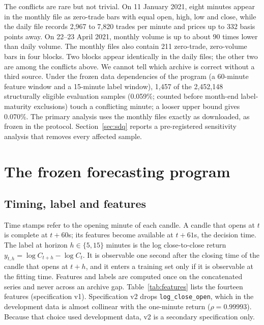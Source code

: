 \documentclass[11pt]{article}
\begin{document}
The conflicts are rare but not trivial. On 11 January 2021, eight minutes appear in the monthly file as zero-trade bars with equal open, high, low and close, while the daily file records 2,967 to 7,820 trades per minute and prices up to 332 basis points away. On 22--23 April 2021, monthly volume is up to about 90 times lower than daily volume. The monthly files also contain 211 zero-trade, zero-volume bars in four blocks. Two blocks appear identically in the daily files; the other two are among the conflicts above. We cannot tell which archive is correct without a third source. Under the frozen data dependencies of the program (a 60-minute feature window and a 15-minute label window), 1,457 of the 2,452,148 structurally eligible evaluation samples (0.059\%; counted before month-end label-maturity exclusions) touch a conflicting minute; a looser upper bound gives 0.070\%. The primary analysis uses the monthly files exactly as downloaded, as frozen in the protocol. Section~\ref{sec:sdq} reports a pre-registered sensitivity analysis that removes every affected sample.

\section{The frozen forecasting program}

\subsection{Timing, label and features}
Time stamps refer to the opening minute of each candle. A candle that opens at $t$ is complete at $t+60$s; its features become available at $t+61$s, the decision time. The label at horizon $h\in\{5,15\}$ minutes is the log close-to-close return $y_{t,h}=\log C_{t+h}-\log C_t$. It is observable one second after the closing time of the candle that opens at $t+h$, and it enters a training set only if it is observable at the fitting time. Features and labels are computed once on the concatenated series and never across an archive gap. Table~\ref{tab:features} lists the fourteen features (specification v1). Specification v2 drops \texttt{log\_close\_open}, which in the development data is almost collinear with the one-minute return ($\rho=0.99993$). Because that choice used development data, v2 is a secondary specification only.
\end{document}
